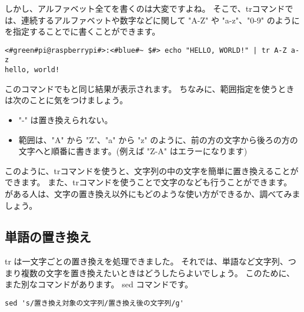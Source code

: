 しかし、アルファベット全てを書くのは大変ですよね。
そこで、trコマンドでは、連続するアルファベットや数字などに関して "A-Z" や "a-z"、"0-9"
のようにを指定することでに書くことができます。

\begin{lstlisting}[caption=範囲指定を使った置き換え, label=tr_range]
<#green#pi@raspberrypi#>:<#blue#~ $#> echo "HELLO, WORLD!" | tr A-Z a-z
hello, world!
\end{lstlisting}

このコマンドでもと同じ結果が表示されます。
ちなみに、範囲指定を使うときは次のことに気をつけましょう。
\begin{itemize}
    \item "-" は置き換えられない。
    \item 範囲は、"A" から "Z"、"a" から "z" のように、前の方の文字から後ろの方の文字へと順番に書きます。(例えば "Z-A"
          はエラーになります)
\end{itemize}

このように、trコマンドを使うと、文字列の中の文字を簡単に置き換えることができます。
また、trコマンドを使うことで文字のなども行うことができます。
がある人は、文字の置き換え以外にもどのような使い方ができるか、調べてみましょう。

\begin{tcolorbox}[title=\useOmetoi]
    \begin{enumerate}
    \end{enumerate}
\end{tcolorbox}

\subsection{単語の置き換え}
tr は一文字ごとの置き換えを処理できました。
それでは、単語など文字列、つまり複数の文字を置き換えたいときはどうしたらよいでしょう。
このために、また別なコマンドがあります。
sed コマンドです。

\begin{lstlisting}[caption=sed コマンドの\ruby{基本的}{き|ほん|てき}な使い方, label=sed_usage]
sed 's/置き換え対象の文字列/置き換え後の文字列/g'
\end{lstlisting}


